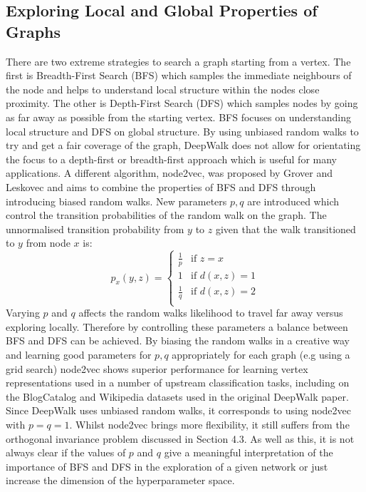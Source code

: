 \documentclass[a4paper]{article}
\begin{document}
\subsection{Exploring Local and Global Properties of Graphs}
There are two extreme strategies to search a graph starting from a vertex. The
first is Breadth-First Search (BFS) which samples the immediate neighbours of
the node and helps to understand local structure within the nodes close
proximity. The other is Depth-First Search (DFS) which samples nodes by going as
far away as possible from the starting vertex. BFS focuses on understanding
local structure and DFS on global structure. By using unbiased random walks to
try and get a fair coverage of the graph, DeepWalk does not allow for
orientating the focus to a depth-first or breadth-first approach which is useful
for many applications. A different algorithm, node2vec, was proposed by Grover
and Leskovec\cite{grover_leskovec2016} and aims to combine the
properties of BFS and DFS through introducing biased random walks. New
parameters $p,q$ are introduced which control the transition probabilities of
the random walk on the graph. The unnormalised transition probability from $y$
to $z$ given that the walk transitioned to $y$ from node $x$ is:
\begin{equation*}
  p_x(y,z)= 
  \begin{cases}
    \frac{1}{p}& \text{if } z = x\\
    1          & \text{if } d(x,z) = 1\\
    \frac{1}{q}& \text{if } d(x,z) = 2\\
  \end{cases}
\end{equation*}
Varying $p$ and $q$ affects the random walks likelihood to travel far away
versus exploring locally. Therefore by controlling these parameters a balance
between BFS and DFS can be achieved. By biasing the random walks in a creative
way and learning good parameters for $p,q$ appropriately for each graph (e.g
using a grid search) node2vec shows superior performance for learning vertex
representations used in a number of upstream classification tasks, including on
the BlogCatalog and Wikipedia datasets used in the original DeepWalk paper.\\
Since DeepWalk uses unbiased random walks, it corresponds to using node2vec with $p=q=1$. Whilst node2vec brings
more flexibility, it still suffers from the orthogonal invariance problem discussed in Section 4.3. As well as this, it is not always clear if the values of $p$ and $q$ give a
meaningful interpretation of the importance of BFS and DFS in the exploration of a given network or just increase the dimension of the hyperparameter space.
\end{document}
